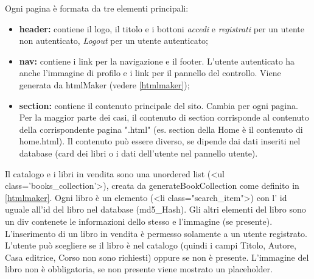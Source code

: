 Ogni pagina è formata da tre elementi principali:
\begin{itemize}
    \item \textbf{header:} contiene il logo, il titolo e i bottoni \textit{accedi} e \textit{registrati} per un utente non autenticato, \textit{Logout} per un utente autenticato;
    \item \textbf{nav:} contiene i link per la navigazione e il footer. L'utente autenticato ha anche l'immagine di profilo e i link per il pannello del controllo. Viene generata da htmlMaker (vedere \ref{htmlmaker});
    \item \textbf{section:} contiene il contenuto principale del sito. Cambia per ogni pagina. Per la maggior parte dei casi, il contenuto di section corrisponde al contenuto della corrispondente pagina ".html" (es. section della Home è il contenuto di home.html). Il contenuto può essere diverso, se dipende dai dati inseriti nel database (card dei libri o i dati dell'utente nel pannello utente).
\end{itemize}
Il catalogo e i libri in vendita sono una unordered list (<ul class='books\_collection'>), creata da generateBookCollection come definito in \ref{htmlmaker}. Ogni libro è un elemento (<li class="search\_item">) con l' id uguale all'id del libro nel database (md5\_Hash). Gli altri elementi del libro sono un div contenete le informazioni dello stesso e l'immagine (se presente).\\
L'inserimento di un libro in vendita è permesso solamente a un utente registrato. L'utente può scegliere se il libro è nel catalogo (quindi i campi Titolo, Autore, Casa editrice, Corso non sono richiesti) oppure se non è presente. L'immagine del libro non è obbligatoria, se non presente viene mostrato un placeholder.